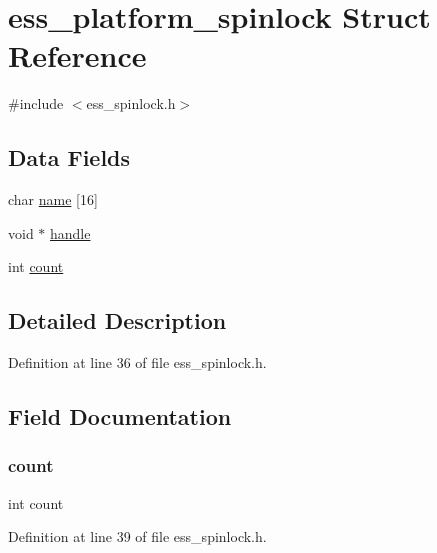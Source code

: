 \hypertarget{structess__platform__spinlock}{}\section{ess\+\_\+platform\+\_\+spinlock Struct Reference}
\label{structess__platform__spinlock}


{\ttfamily \#include $<$ess\+\_\+spinlock.\+h$>$}

\subsection*{Data Fields}
\begin{DoxyCompactItemize}
\item 
char \hyperlink{structess__platform__spinlock_acd328517a6cf718155c2e6e22b671ca9}{name} \mbox{[}16\mbox{]}
\item 
void $\ast$ \hyperlink{structess__platform__spinlock_a81011b79683fab64ce3aff71114f8fdd}{handle}
\item 
int \hyperlink{structess__platform__spinlock_ad43c3812e6d13e0518d9f8b8f463ffcf}{count}
\end{DoxyCompactItemize}


\subsection{Detailed Description}


Definition at line 36 of file ess\+\_\+spinlock.\+h.



\subsection{Field Documentation}
\mbox{\label{structess__platform__spinlock_ad43c3812e6d13e0518d9f8b8f463ffcf}} 
\subsubsection{\texorpdfstring{count}{count}}
{\footnotesize\ttfamily int count}



Definition at line 39 of file ess\+\_\+spinlock.\+h.

